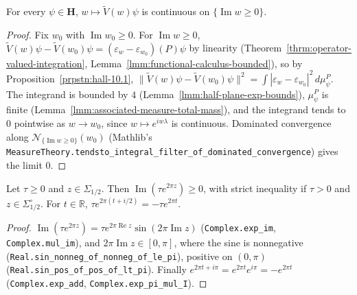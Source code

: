 \begin{lemma}
    \label{lmm:positive-energy-extension-strongly-continuous}
    \leanok
    For every $\psi \in \mathbf{H}$, $w \mapsto \widetilde{V}(w)\psi$ is continuous on $\{\operatorname{Im} w \ge 0\}$.
\end{lemma}
\begin{proof}
    \leanok
    Fix $w_0$ with $\operatorname{Im} w_0 \ge 0$. For $\operatorname{Im} w \ge 0$, $\widetilde{V}(w)\psi - \widetilde{V}(w_0)\psi = (\varepsilon_w - \varepsilon_{w_0})(P)\psi$ by linearity (Theorem~\ref{thrm:operator-valued-integration}, Lemma~\ref{lmm:functional-calculus-bounded}), so by Proposition~\ref{prpstn:hall-10.1}, $\|\widetilde{V}(w)\psi - \widetilde{V}(w_0)\psi\|^2 = \int |\varepsilon_w - \varepsilon_{w_0}|^2 \, d\mu^P_\psi$. The integrand is bounded by $4$ (Lemma~\ref{lmm:half-plane-exp-bounds}), $\mu^P_\psi$ is finite (Lemma~\ref{lmm:associated-measure-total-mass}), and the integrand tends to $0$ pointwise as $w \to w_0$, since $w \mapsto e^{iw\lambda}$ is continuous. Dominated convergence along $\mathcal{N}_{\{\operatorname{Im} w \ge 0\}}(w_0)$ (Mathlib's \texttt{MeasureTheory.tendsto\_integral\_filter\_of\_dominated\_convergence}) gives the limit $0$.
\end{proof}

\begin{lemma}
    \label{lmm:dilation-strip-half-plane}
    \leanok
    Let $\tau \ge 0$ and $z \in \Sigma_{1/2}$. Then $\operatorname{Im}(\tau e^{2\pi z}) \ge 0$, with strict inequality if $\tau > 0$ and $z \in \Sigma^\circ_{1/2}$. For $t \in \mathbb{R}$, $\tau e^{2\pi(t + i/2)} = -\tau e^{2\pi t}$.
\end{lemma}
\begin{proof}
    \leanok
    $\operatorname{Im}(\tau e^{2\pi z}) = \tau e^{2\pi\operatorname{Re} z}\sin(2\pi\operatorname{Im} z)$ (\texttt{Complex.exp\_im}, \texttt{Complex.mul\_im}), and $2\pi\operatorname{Im} z \in [0, \pi]$, where the sine is nonnegative (\texttt{Real.sin\_nonneg\_of\_nonneg\_of\_le\_pi}), positive on $(0, \pi)$ (\texttt{Real.sin\_pos\_of\_pos\_of\_lt\_pi}). Finally $e^{2\pi t + i\pi} = e^{2\pi t}e^{i\pi} = -e^{2\pi t}$ (\texttt{Complex.exp\_add}, \texttt{Complex.exp\_pi\_mul\_I}).
\end{proof}

